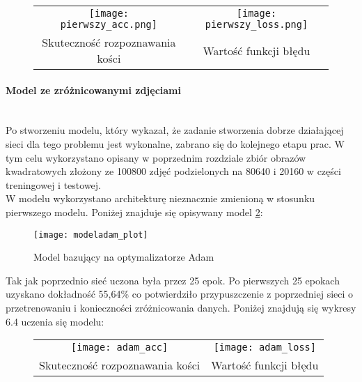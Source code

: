 \begin{figure}[h!]
\begin{center}
\begin{tabular}{cc}
\texttt{[image: pierwszy\_acc.png]} &
\texttt{[image: pierwszy\_loss.png]} \\
 Skuteczność rozpoznawania kości & Wartość funkcji błędu\\
\end{tabular}
\label{fig:first_plots}
\end{center}
\end{figure}

\paragraph{Model ze zróżnicowanymi zdjęciami} \mbox{}\\
Po stworzeniu modelu, który wykazał, że zadanie stworzenia dobrze działającej sieci dla
tego problemu jest wykonalne, zabrano się do kolejnego etapu prac. W tym celu
wykorzystano opisany w poprzednim rozdziale zbiór obrazów kwadratowych złożony ze 100800 zdjęć
podzielonych na 80640 i 20160 w części treningowej i testowej.\\
W modelu wykorzystano architekturę nieznacznie zmienioną w stosunku pierwszego modelu.
Poniżej znajduje się opisywany model \ref{fig:adam}: \newpage

\begin{figure}[h!]
\centering
\texttt{[image: modeladam\_plot]}
\caption{Model bazujący na optymalizatorze Adam}
\label{fig:adam}
\end{figure}
Tak jak poprzednio sieć uczona była przez 25 epok.
Po pierwszych 25 epokach uzyskano dokładność 55,64\% co potwierdziło przypuszczenie
z poprzedniej sieci o przetrenowaniu i konieczności zróżnicowania danych.
Poniżej znajdują się wykresy 6.4 uczenia się modelu:
\newpage
\begin{figure}[h!]
\begin{center}
\begin{tabular}{cc}
\texttt{[image: adam\_acc]} &
\texttt{[image: adam\_loss]} \\
 Skuteczność rozpoznawania kości & Wartość funkcji błędu\\
\end{tabular}
\label{fig:adam_plots}
\end{center}
\end{figure}

